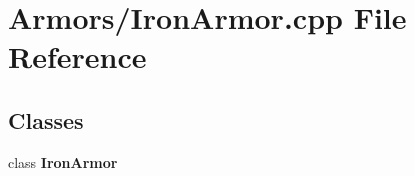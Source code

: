 \section{Armors/\-Iron\-Armor.cpp File Reference}
\label{_iron_armor_8cpp}
\subsection*{Classes}
\begin{DoxyCompactItemize}
\item 
class {\bf Iron\-Armor}
\end{DoxyCompactItemize}
